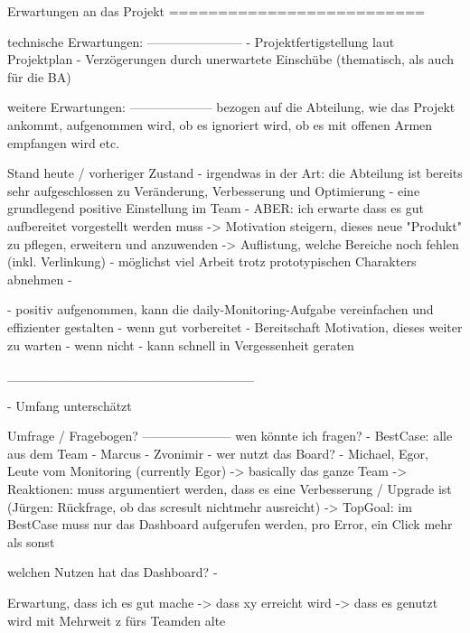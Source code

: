 Erwartungen an das Projekt
==========================

technische Erwartungen:
-----------------------
- Projektfertigstellung laut Projektplan
- Verzögerungen durch unerwartete Einschübe (thematisch, als auch für die BA)

weitere Erwartungen:
--------------------
bezogen auf die Abteilung, wie das Projekt ankommt, aufgenommen wird, ob es ignoriert wird, ob es mit offenen Armen empfangen wird etc.

Stand heute / vorheriger Zustand - irgendwas in der Art:
die Abteilung ist bereits sehr aufgeschlossen zu Veränderung, Verbesserung und Optimierung
- eine grundlegend positive Einstellung im Team
- ABER: ich erwarte dass es gut aufbereitet vorgestellt werden muss
   -> Motivation steigern, dieses neue "Produkt" zu pflegen, erweitern und anzuwenden
   -> Auflistung, welche Bereiche noch fehlen (inkl. Verlinkung) - möglichst viel Arbeit trotz prototypischen Charakters abnehmen
- 

- positiv aufgenommen, kann die daily-Monitoring-Aufgabe vereinfachen und effizienter gestalten
- wenn gut vorbereitet - Bereitschaft Motivation, dieses weiter zu warten
- wenn nicht - kann schnell in Vergessenheit geraten

__________________________

- Umfang unterschätzt

Umfrage / Fragebogen?
---------------------
wen könnte ich fragen? - BestCase: alle aus dem Team
- Marcus
- Zvonimir
- wer nutzt das Board? - Michael, Egor, Leute vom Monitoring (currently Egor)
-> basically das ganze Team
-> Reaktionen: muss argumentiert werden, dass es eine Verbesserung / Upgrade ist (Jürgen: Rückfrage, ob das scresult nichtmehr ausreicht)
-> TopGoal: im BestCase muss nur das Dashboard aufgerufen werden, pro Error, ein Click mehr als sonst

welchen Nutzen hat das Dashboard?
- 

Erwartung, dass ich es gut mache
-> dass xy erreicht wird
-> dass es genutzt wird mit Mehrweit z fürs Teamden alte